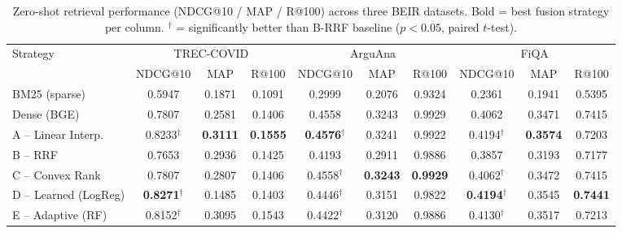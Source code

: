 \begin{table}[ht]
\centering
\small
\caption{Zero-shot retrieval performance (NDCG@10 / MAP / R@100) across three BEIR datasets. Bold = best fusion strategy per column. $^\dagger$ = significantly better than B-RRF baseline ($p < 0.05$, paired $t$-test).}
\label{tab:main_results}
\begin{tabular}{l ccc ccc ccc}
\toprule
Strategy & \multicolumn{3}{c}{TREC-COVID} & \multicolumn{3}{c}{ArguAna} & \multicolumn{3}{c}{FiQA} \\
\cmidrule(lr){2-4} \cmidrule(lr){5-7} \cmidrule(lr){8-10}
 & NDCG@10 & MAP & R@100 & NDCG@10 & MAP & R@100 & NDCG@10 & MAP & R@100 \\
\midrule
BM25 (sparse) & 0.5947 & 0.1871 & 0.1091 & 0.2999 & 0.2076 & 0.9324 & 0.2361 & 0.1941 & 0.5395 \\
Dense (BGE) & 0.7807 & 0.2581 & 0.1406 & 0.4558 & 0.3243 & 0.9929 & 0.4062 & 0.3471 & 0.7415 \\
\midrule
A – Linear Interp. & 0.8233$^\dagger$ & \textbf{0.3111} & \textbf{0.1555} & \textbf{0.4576}$^\dagger$ & 0.3241 & 0.9922 & 0.4194$^\dagger$ & \textbf{0.3574} & 0.7203 \\
B – RRF & 0.7653 & 0.2936 & 0.1425 & 0.4193 & 0.2911 & 0.9886 & 0.3857 & 0.3193 & 0.7177 \\
C – Convex Rank & 0.7807 & 0.2807 & 0.1406 & 0.4558$^\dagger$ & \textbf{0.3243} & \textbf{0.9929} & 0.4062$^\dagger$ & 0.3472 & 0.7415 \\
D – Learned (LogReg) & \textbf{0.8271}$^\dagger$ & 0.1485 & 0.1403 & 0.4446$^\dagger$ & 0.3151 & 0.9822 & \textbf{0.4194}$^\dagger$ & 0.3545 & \textbf{0.7441} \\
E – Adaptive (RF) & 0.8152$^\dagger$ & 0.3095 & 0.1543 & 0.4422$^\dagger$ & 0.3120 & 0.9886 & 0.4130$^\dagger$ & 0.3517 & 0.7213 \\
\bottomrule
\end{tabular}
\end{table}
